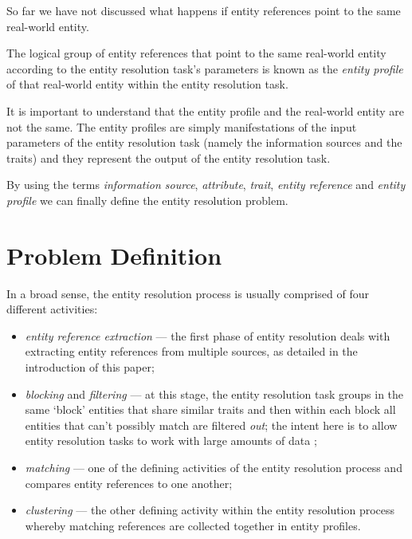 \documentclass[11pt]{article}
\begin{document}
    So far we have not discussed what happens if entity references point to the
    same real-world entity.
    
    \begin{defn}
        The logical group of entity references that point to the same real-world
        entity according to the entity resolution task's parameters is known as
        the \textit{entity profile} of that real-world entity within the entity
        resolution task.
    \end{defn}

    It is important to understand that the entity profile and the real-world
    entity are not the same.
    The entity profiles are simply manifestations of the input parameters of the
    entity resolution task (namely the information sources and the traits) and
    they represent the output of the entity resolution task.
    
    By using the terms \textit{information source}, \textit{attribute},
    \textit{trait}, \textit{entity reference} and \textit{entity profile} we can
    finally define the entity resolution problem.

    \section{Problem Definition}\label{sec:problem}

    In a broad sense, the entity resolution process is usually comprised of four
    different activities\cite{Pap19,Tal11}:
    \begin{itemize}
        \item \textit{entity reference extraction} --- the first phase of entity
        resolution deals with extracting entity references from multiple
        sources, as detailed in the introduction of this paper;
        \item \textit{blocking} and \textit{filtering} --- at this stage, the
        entity resolution task groups in the same `block' entities that share
        similar traits and then within each block all entities that can't
        possibly match are filtered \textit{out}; the intent here is to allow
        entity resolution tasks to work with large amounts of data \cite{Pap19};
        \item \textit{matching} --- one of the defining activities of the entity
        resolution process and compares entity references to one another;
        \item \textit{clustering} --- the other defining activity within the
        entity resolution process whereby matching references are collected
        together in entity profiles.
    \end{itemize}
\end{document}
